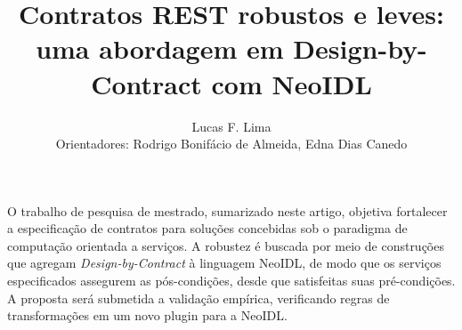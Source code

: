 \documentclass[12pt]{article}
\title{Contratos REST robustos e leves:\\uma abordagem em Design-by-Contract
com NeoIDL}
\author{Lucas F. Lima\inst{1}\\Orientadores: Rodrigo Bonifácio de
Almeida\inst{2}, Edna Dias Canedo\inst{1}}
\newcommand{\neoidl}{NeoIDL}
\begin{document}
 

\maketitle

\begin{center}


\end{center}

\begin{resumo} 
  O trabalho de pesquisa de mestrado, sumarizado neste artigo, objetiva
  fortalecer a especificação de contratos para soluções concebidas sob o
  paradigma de computação orientada a serviços. A robustez é buscada por meio de
  construções que agregam \textit{Design-by-Contract} à linguagem \neoidl, de
  modo que os serviços especificados assegurem as pós-condições, desde que
  satisfeitas suas pré-condições.
  A proposta será submetida a validação empírica, verificando regras de
  transformações em um novo plugin para a \neoidl.
\end{resumo}

\newpage





% 





\end{document}

